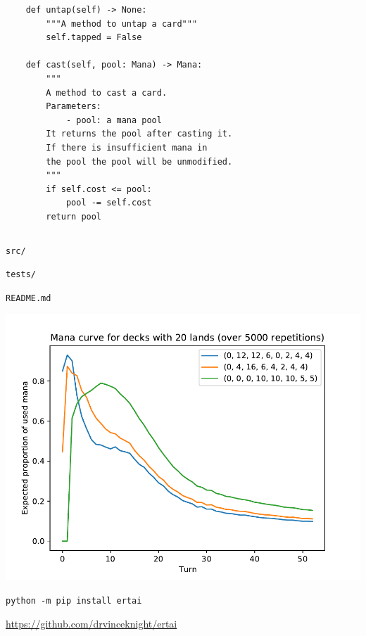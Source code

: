 \documentclass{beamer}
\begin{document}
\begin{frame}[fragile]
\begin{columns}
\begin{column}{.5\textwidth}
\begin{verbatim}
    def untap(self) -> None:
        """A method to untap a card"""
        self.tapped = False

    def cast(self, pool: Mana) -> Mana:
        """
        A method to cast a card.
        Parameters:
            - pool: a mana pool
        It returns the pool after casting it. 
        If there is insufficient mana in
        the pool the pool will be unmodified.
        """
        if self.cost <= pool:
            pool -= self.cost
        return pool
                \end{verbatim}
            \end{column}
        \end{columns}
    \end{frame}

    \begin{frame}
        \Huge
        \begin{center}
            \texttt{src/}
        \end{center}
    \end{frame}

    \begin{frame}
        \Huge
        \begin{center}
            \texttt{tests/}
        \end{center}
    \end{frame}

    \begin{frame}
        \Huge
        \begin{center}
            \texttt{README.md}
        \end{center}
    \end{frame}

    \begin{frame}
        \begin{center}
            \includegraphics[width=.8\textwidth]{./img/mana_curve/main.pdf}
        \end{center}
    \end{frame}

    \begin{frame}
        \Large
        \begin{center}
            \texttt{python -m pip install ertai}
        \end{center}
        \begin{center}
            \url{https://github.com/drvinceknight/ertai}
        \end{center}
    \end{frame}
\end{document}
